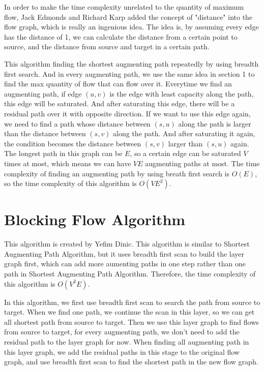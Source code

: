 \documentclass[twocolumn,9pt]{extarticle}
\begin{document}
In order to make the time complexity unrelated to the quantity of maximum flow, Jack Edmonds and Richard Karp added the concept of "distance" into the flow graph, which is really an ingenious idea. The idea is, by assuming every edge has the distance of 1, we can calculate the distance from a certain point to source, and the distance from source and target in a certain path.

This algorithm finding the shortest augmenting path repeatedly by using breadth first search. And in every augmenting path, we use the same idea in section 1 to find the max quantity of flow that can flow over it.
Everytime we find an augmenting path, if edge $(u, v)$ is the edge with least capacity along the path, this edge will be saturated. And after saturating this edge, there will be a residual path over it with opposite direction. If we want to use this edge again, we need to find a path whose distance between $(s, u)$ along the path is larger than the distance between $(s, v)$ along the path. And after saturating it again, the condition becomes the distance between $(s, v)$ larger than $(s, u)$ again. The longest path in this graph can be $E$, so a certain edge can be saturated $V$ times at most, which means we can have $VE$ augmenting paths at most. The time complexity of finding an augmenting path by using breath first search is $O(E)$, so the time complexity of this algorithm is $O(VE^2)$.

\section{Blocking Flow Algorithm}
This algorithm is created by Yefim Dinic. This algorithm is similar to Shortest Augmenting Path Algorithm, but it uses breadth first scan to build the layer graph first, which can add more aumenting paths in one step rather than one path in Shortest Augmenting Path Algorithm. Therefore, the time complexity of this algorithm is $O(V^2E)$.

In this algorithm, we first use breadth first scan to search the path from source to target. When we find one path, we continue the scan in this layer, so we can get all shortest path from source to target. Then we use this layer graph to find flows from source to target, for every augmenting path, we don't need to add the residual path to the layer graph for now. When finding all augmenting path in this layer graph, we add the residual paths in this stage to the original flow graph, and use breadth first scan to find the shortest path in the new flow graph.
\end{document}
